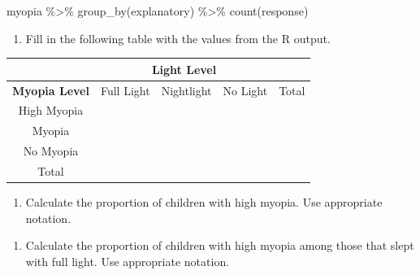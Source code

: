 \documentclass[
]{report}
\newenvironment{Shaded}{\begin{snugshade}}{\end{snugshade}}
\newcommand{\FunctionTok}[1]{\textcolor[rgb]{0.00,0.00,0.00}{#1}}
\newcommand{\NormalTok}[1]{#1}
\newcommand{\SpecialCharTok}[1]{\textcolor[rgb]{0.00,0.00,0.00}{#1}}
\providecommand{\tightlist}{%
  \setlength{\itemsep}{0pt}\setlength{\parskip}{0pt}}
\begin{document}
\begin{Shaded}
\begin{Highlighting}[]
\NormalTok{myopia }\SpecialCharTok{\%\textgreater{}\%} \FunctionTok{group\_by}\NormalTok{(explanatory) }\SpecialCharTok{\%\textgreater{}\%} \FunctionTok{count}\NormalTok{(response)}
\end{Highlighting}
\end{Shaded}

\begin{enumerate}
\def\labelenumi{\arabic{enumi}.}
\setcounter{enumi}{10}
\tightlist
\item
  Fill in the following table with the values from the R output.
\end{enumerate}

\begin{center}
\begingroup
\setlength{\tabcolsep}{14pt} %
\renewcommand{\arraystretch}{2} %
\begin{tabular}{|c|c|c|c|c|}
\hline
 & \multicolumn{3}{|c|}{\textbf{Light Level}} & \\ \hline
\textbf{Myopia Level} & Full Light & Nightlight & No Light & Total \\ \hline
 High Myopia & & & & \\ \hline
 Myopia & & & & \\ \hline
 No Myopia & & & & \\ \hline
 Total & & & & \\ \hline  
\end{tabular}
\endgroup
\end{center}

\begin{enumerate}
\def\labelenumi{\arabic{enumi}.}
\setcounter{enumi}{11}
\tightlist
\item
  Calculate the proportion of children with high myopia. Use appropriate notation.
\end{enumerate}

\vspace{0.3in}

\begin{enumerate}
\def\labelenumi{\arabic{enumi}.}
\setcounter{enumi}{12}
\tightlist
\item
  Calculate the proportion of children with high myopia among those that slept with full light. Use appropriate notation.
\end{enumerate}

\vspace{0.3in}
\end{document}
